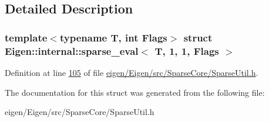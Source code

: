 \subsection{Detailed Description}
\subsubsection*{template$<$typename T, int Flags$>$\newline
struct Eigen\+::internal\+::sparse\+\_\+eval$<$ T, 1, 1, Flags $>$}



Definition at line \hyperlink{eigen_2_eigen_2src_2_sparse_core_2_sparse_util_8h_source_l00105}{105} of file \hyperlink{eigen_2_eigen_2src_2_sparse_core_2_sparse_util_8h_source}{eigen/\+Eigen/src/\+Sparse\+Core/\+Sparse\+Util.\+h}.



The documentation for this struct was generated from the following file\+:\begin{DoxyCompactItemize}
\item 
eigen/\+Eigen/src/\+Sparse\+Core/\+Sparse\+Util.\+h\end{DoxyCompactItemize}
